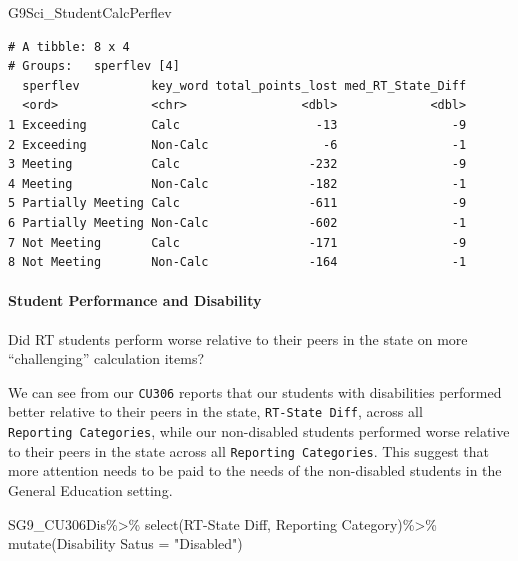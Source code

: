 \documentclass[
  letterpaper,
  DIV=11,
  numbers=noendperiod]{scrartcl}
\let\oldparagraph\paragraph
\renewcommand{\paragraph}[1]{\oldparagraph{#1}\mbox{}}
\newenvironment{Shaded}{\begin{snugshade}}{\end{snugshade}}
\newcommand{\AttributeTok}[1]{\textcolor[rgb]{0.40,0.45,0.13}{#1}}
\newcommand{\FunctionTok}[1]{\textcolor[rgb]{0.28,0.35,0.67}{#1}}
\newcommand{\NormalTok}[1]{\textcolor[rgb]{0.00,0.23,0.31}{#1}}
\newcommand{\OtherTok}[1]{\textcolor[rgb]{0.00,0.23,0.31}{#1}}
\newcommand{\SpecialCharTok}[1]{\textcolor[rgb]{0.37,0.37,0.37}{#1}}
\newcommand{\StringTok}[1]{\textcolor[rgb]{0.13,0.47,0.30}{#1}}
\begin{document}
\begin{Shaded}
\begin{Highlighting}[]
\NormalTok{G9Sci\_StudentCalcPerflev}
\end{Highlighting}
\end{Shaded}

\begin{verbatim}
# A tibble: 8 x 4
# Groups:   sperflev [4]
  sperflev          key_word total_points_lost med_RT_State_Diff
  <ord>             <chr>                <dbl>             <dbl>
1 Exceeding         Calc                   -13                -9
2 Exceeding         Non-Calc                -6                -1
3 Meeting           Calc                  -232                -9
4 Meeting           Non-Calc              -182                -1
5 Partially Meeting Calc                  -611                -9
6 Partially Meeting Non-Calc              -602                -1
7 Not Meeting       Calc                  -171                -9
8 Not Meeting       Non-Calc              -164                -1
\end{verbatim}

\hypertarget{student-performance-and-disability}{%
\paragraph{Student Performance and
Disability}\label{student-performance-and-disability}}

Did RT students perform worse relative to their peers in the state on
more ``challenging'' calculation items?

We can see from our \texttt{CU306} reports that our students with
disabilities performed better relative to their peers in the state,
\texttt{RT-State\ Diff}, across all \texttt{Reporting\ Categories},
while our non-disabled students performed worse relative to their peers
in the state across all \texttt{Reporting\ Categories}. This suggest
that more attention needs to be paid to the needs of the non-disabled
students in the General Education setting.

\begin{Shaded}
\begin{Highlighting}[]
\NormalTok{SG9\_CU306Dis}\SpecialCharTok{\%\textgreater{}\%}
  \FunctionTok{select}\NormalTok{(}\StringTok{\textasciigrave{}}\AttributeTok{RT{-}State Diff}\StringTok{\textasciigrave{}}\NormalTok{, }\StringTok{\textasciigrave{}}\AttributeTok{Reporting Category}\StringTok{\textasciigrave{}}\NormalTok{)}\SpecialCharTok{\%\textgreater{}\%}
  \FunctionTok{mutate}\NormalTok{(}\StringTok{\textasciigrave{}}\AttributeTok{Disability Satus}\StringTok{\textasciigrave{}} \OtherTok{=} \StringTok{"Disabled"}\NormalTok{)}
\end{Highlighting}
\end{Shaded}
\end{document}
